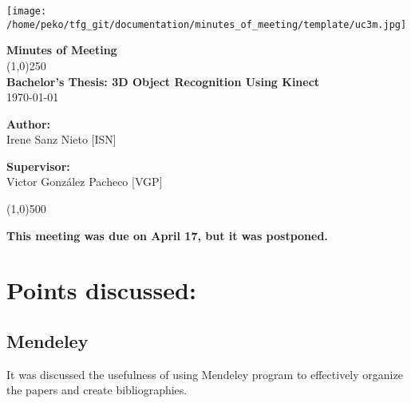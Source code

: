 \documentclass{article}
\newenvironment{myindentpar}[1]%
 {\begin{list}{}%
         {\setlength{\leftmargin}{#1}}%
         \item[]%
 }
 {\end{list}}
\begin{document}
\texttt{[image: /home/peko/tfg\_git/documentation/minutes\_of\_meeting/template/uc3m.jpg]}

\vspace{-1cm}
\begin{minipage}[b]{1\linewidth}
	\begin{center}
	{\Huge \bfseries{Minutes of Meeting}}\\
	\line(1,0){250}\\[1cm]
	{\LARGE \textbf{Bachelor's Thesis: 3D Object Recognition Using Kinect}}\\[0.5cm]
	{\large \today}
	\end{center}
\end {minipage}



\begin{minipage}{0.55\textwidth}
\begin{flushleft} \large
\textbf{{Author:}\\}
Irene Sanz Nieto [ISN]\\
\end{flushleft}
\end{minipage}
\begin{minipage}{0.4\textwidth}
\begin{flushright} \large
\textbf{Supervisor: }\\
Victor González Pacheco [VGP]
\end{flushright}\end{minipage}

\begin{center}
\line(1,0){500}
\end{center}

\renewcommand{\thesubsection}
{\hspace*{1cm} \arabic{section}.\arabic{subsection}}

\begin {center}
{\Large \textbf{This meeting was due on April 17, but it was postponed. }}
\end{center}


\section{\LARGE Points discussed: }
	
	\subsection{Mendeley}
		\begin{myindentpar}{1cm} 
		It was discussed the usefulness of using Mendeley program to effectively organize the papers and create bibliographies.
		\end{myindentpar}
\end{document}
